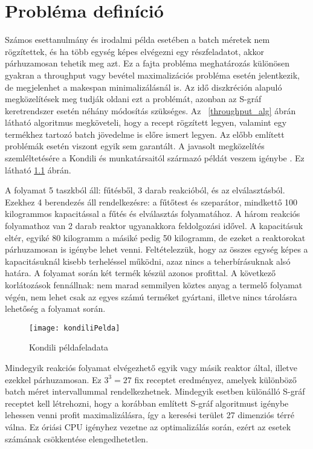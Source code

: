 \chapter{Probléma definíció}
Számos esettanulmány és irodalmi példa esetében a batch méretek nem rögzítettek, és ha több egység képes elvégezni egy részfeladatot, akkor párhuzamosan tehetik meg azt. Ez a fajta probléma meghatározás különösen gyakran a throughput vagy bevétel maximalizációs probléma esetén jelentkezik, de megjelenhet a makespan minimalizálásnál is. Az idő diszkréción alapuló megközelítések meg tudják oldani ezt a problémát, azonban az S-gráf keretrendszer esetén néhány módosítás szükséges. Az ~\ref{throughput_alg} ábrán látható algoritmus megköveteli, hogy a recept rögzített legyen, valamint egy termékhez tartozó batch jövedelme is előre ismert legyen. Az előbb említett problémák esetén viszont egyik sem garantált. 
A javasolt megközelítés szemléltetésére a Kondili és munkatársaitól származó példát veszem igénybe \cite{kondili}. Ez látható \ref{kondiliPelda} ábrán.

A folyamat 5 taszkból áll: fűtésből, 3 darab reakcióból, és az elválasztásból. Ezekhez 4 berendezés áll rendelkezésre: a fűtőtest és szeparátor, mindkettő 100 kilogrammos kapacitással a fűtés és elválasztás folyamatához. A három reakciós folyamathoz van 2 darab reaktor ugyanakkora feldolgozási idővel. A kapacitásuk eltér, egyiké 80 kilogramm a másiké pedig 50 kilogramm, de ezeket a reaktorokat párhuzamosan is igénybe lehet venni. Feltételezzük, hogy az összes egység képes a kapacitásuknál kisebb terheléssel működni, azaz nincs a teherbírásuknak alsó határa. A folyamat során két termék készül azonos profittal. A következő korlátozások fennállnak: nem marad semmilyen köztes anyag a termelő folyamat végén, nem lehet csak az egyes számú terméket gyártani, illetve nincs tárolásra lehetőség a folyamat során.
\begin{figure}[H]
\begin{center}
\texttt{[image: kondiliPelda]}
\caption{Kondili példafeladata}
\label{kondiliPelda}
\end{center}
\end{figure}
Mindegyik reakciós folyamat elvégezhető egyik vagy másik reaktor által, illetve ezekkel párhuzamosan. Ez $3^3 = 27$ fix receptet eredményez, amelyek különböző batch méret intervallummal rendelkezhetnek. Mindegyik esetben különálló S-gráf receptet kell létrehozni, hogy a korábban említett S-gráf algoritmust igénybe lehessen venni profit maximalizálásra, így a keresési terület 27 dimenziós térré válna. Ez óriási CPU igényhez vezetne az optimalizálás során, ezért az esetek számának csökkentése elengedhetetlen.

